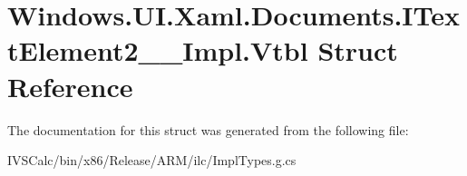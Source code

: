 \hypertarget{struct_windows_1_1_u_i_1_1_xaml_1_1_documents_1_1_i_text_element2_____impl_1_1_vtbl}{}\section{Windows.\+U\+I.\+Xaml.\+Documents.\+I\+Text\+Element2\+\_\+\+\_\+\+Impl.\+Vtbl Struct Reference}
\label{struct_windows_1_1_u_i_1_1_xaml_1_1_documents_1_1_i_text_element2_____impl_1_1_vtbl}


The documentation for this struct was generated from the following file\+:\begin{DoxyCompactItemize}
\item 
I\+V\+S\+Calc/bin/x86/\+Release/\+A\+R\+M/ilc/Impl\+Types.\+g.\+cs\end{DoxyCompactItemize}
